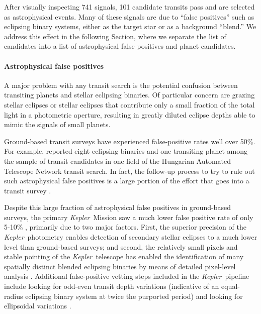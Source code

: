 \documentclass[12pt,preprint]{aastex}
\newcommand{\project}[1]{\textsl{#1}} %
\newcommand{\kepler}{\project{Kepler}}
\newcommand{\sectionname}{Section}
\begin{document}
After visually inspecting 741 signals, 101 candidate transits pass and are
selected as astrophysical events.
Many of these signals are due to ``false positives'' such as eclipsing binary
systems, either as the target star or as a background ``blend.'' We address
this effect in the following \sectionname, where we separate the list of
candidates into a list of astrophysical false positives and planet candidates.


\paragraph{Astrophysical false positives}

A major problem with any transit search is the potential confusion
between transiting planets and stellar eclipsing binaries.  Of
particular concern are grazing stellar eclipses or stellar eclipses
that contribute only a small fraction of the total light in a
photometric aperture, resulting in greatly diluted eclipse depths able
to mimic the signals of small planets.

Ground-based transit surveys have experienced false-positive rates
well over 50\%.  For example, \citet{Latham:2009} reported eight
eclipsing binaries and one transiting planet among the sample of
transit candidates in one field of the Hungarian Automated Telescope
Network transit search.  In fact, the follow-up process to try to rule
out such astrophysical false positives is a large portion of the
effort that goes into a transit survey
\citep[e.g.,][]{Odonovan:2006,Almenara:2009,Poleski:2010}.

Despite this large fraction of astrophysical false positives in
ground-based surveys, the primary \kepler\ Mission saw a much lower
false positive rate of only 5-10\% \citep{Morton:2011, Fressin:2013},
primarily due to two major factors.  First, the superior precision of
the \kepler\ photometry enables detection of secondary stellar
eclipses to a much lower level than ground-based surveys; and second,
the relatively small pixels and stable pointing of the
\kepler\ telescope has enabled the identification of many spatially
distinct blended eclipsing binaries by means of detailed pixel-level
analysis \citep{Bryson:2013}.  Additional false-positive vetting steps
included in the \kepler\ pipeline include looking for odd-even transit
depth variations (indicative of an equal-radius eclipsing binary
system at twice the purported period) and looking for ellipsoidal
variations \citep{Batalha:2010}.
\end{document}
